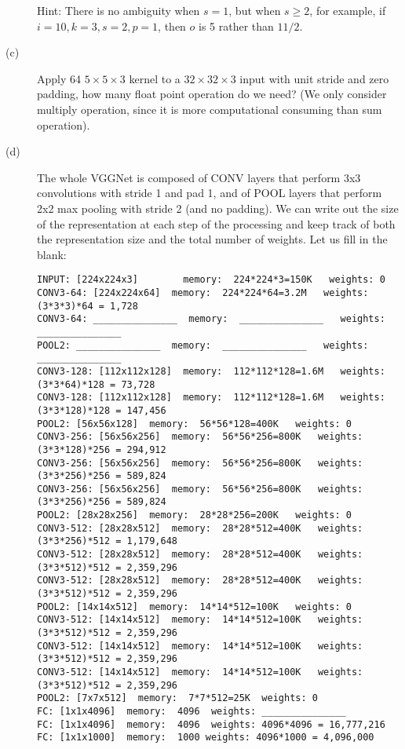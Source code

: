 \documentclass[12pt]{article}
\begin{document}
\begin{description}
	      Hint: There is no ambiguity when $s=1$, but when $s\ge 2$, for example, if $i=10,k=3,s=2,p=1$, then $o$ is 5 rather than $11/2$. 
	\item[(c)] Apply 64 $5\times 5\times 3$ kernel to a $32 \times 32 \times3$ input with unit stride and zero padding, how many float point operation do we need? (We only consider multiply operation, since it is more computational consuming than sum operation). 
	\item[(d)] The whole VGGNet is composed of CONV layers that perform 3x3 convolutions with stride 1 and pad 1, and of POOL layers that perform 2x2 max pooling with stride 2 (and no padding). We can write out the size of the representation at each step of the processing and keep track of both the representation size and the total number of weights. Let us fill in the blank:
	\begin{verbatim}
INPUT: [224x224x3]        memory:  224*224*3=150K   weights: 0
CONV3-64: [224x224x64]  memory:  224*224*64=3.2M   weights: (3*3*3)*64 = 1,728
CONV3-64: _______________  memory:  _______________   weights: _______________
POOL2: _______________  memory:  _______________   weights: _______________
CONV3-128: [112x112x128]  memory:  112*112*128=1.6M   weights: (3*3*64)*128 = 73,728
CONV3-128: [112x112x128]  memory:  112*112*128=1.6M   weights: (3*3*128)*128 = 147,456
POOL2: [56x56x128]  memory:  56*56*128=400K   weights: 0
CONV3-256: [56x56x256]  memory:  56*56*256=800K   weights: (3*3*128)*256 = 294,912
CONV3-256: [56x56x256]  memory:  56*56*256=800K   weights: (3*3*256)*256 = 589,824
CONV3-256: [56x56x256]  memory:  56*56*256=800K   weights: (3*3*256)*256 = 589,824
POOL2: [28x28x256]  memory:  28*28*256=200K   weights: 0
CONV3-512: [28x28x512]  memory:  28*28*512=400K   weights: (3*3*256)*512 = 1,179,648
CONV3-512: [28x28x512]  memory:  28*28*512=400K   weights: (3*3*512)*512 = 2,359,296
CONV3-512: [28x28x512]  memory:  28*28*512=400K   weights: (3*3*512)*512 = 2,359,296
POOL2: [14x14x512]  memory:  14*14*512=100K   weights: 0
CONV3-512: [14x14x512]  memory:  14*14*512=100K   weights: (3*3*512)*512 = 2,359,296
CONV3-512: [14x14x512]  memory:  14*14*512=100K   weights: (3*3*512)*512 = 2,359,296
CONV3-512: [14x14x512]  memory:  14*14*512=100K   weights: (3*3*512)*512 = 2,359,296
POOL2: [7x7x512]  memory:  7*7*512=25K  weights: 0
FC: [1x1x4096]  memory:  4096  weights: _______________
FC: [1x1x4096]  memory:  4096  weights: 4096*4096 = 16,777,216
FC: [1x1x1000]  memory:  1000 weights: 4096*1000 = 4,096,000
	\end{verbatim}

\end{description}
\end{document}
